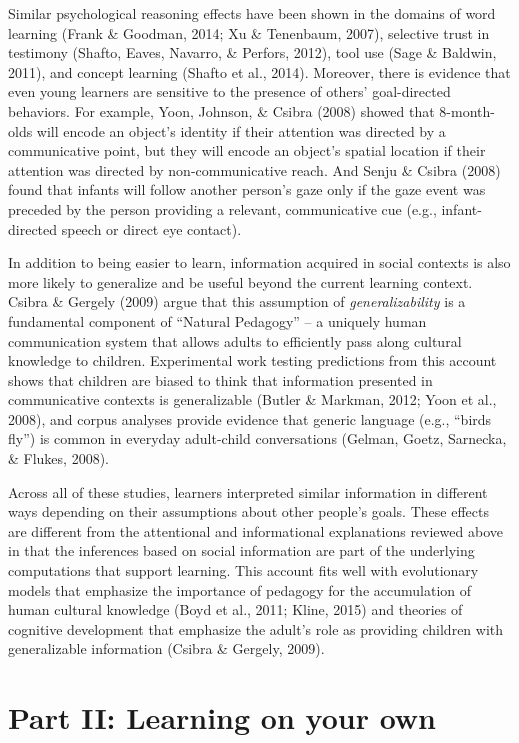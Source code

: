 \documentclass[a4paper,man,apacite,floatsintext]{apa6}
\begin{document}
Similar psychological reasoning effects have been shown in the domains
of word learning (Frank \& Goodman, 2014; Xu \& Tenenbaum, 2007),
selective trust in testimony (Shafto, Eaves, Navarro, \& Perfors, 2012),
tool use (Sage \& Baldwin, 2011), and concept learning (Shafto et al.,
2014). Moreover, there is evidence that even young learners are
sensitive to the presence of others' goal-directed behaviors. For
example, Yoon, Johnson, \& Csibra (2008) showed that 8-month-olds will
encode an object's identity if their attention was directed by a
communicative point, but they will encode an object's spatial location
if their attention was directed by non-communicative reach. And Senju \&
Csibra (2008) found that infants will follow another person's gaze only
if the gaze event was preceded by the person providing a relevant,
communicative cue (e.g., infant-directed speech or direct eye contact).

In addition to being easier to learn, information acquired in social
contexts is also more likely to generalize and be useful beyond the
current learning context. Csibra \& Gergely (2009) argue that this
assumption of \emph{generalizability} is a fundamental component of
``Natural Pedagogy'' -- a uniquely human communication system that
allows adults to efficiently pass along cultural knowledge to children.
Experimental work testing predictions from this account shows that
children are biased to think that information presented in communicative
contexts is generalizable (Butler \& Markman, 2012; Yoon et al., 2008),
and corpus analyses provide evidence that generic language (e.g.,
``birds fly'') is common in everyday adult-child conversations (Gelman,
Goetz, Sarnecka, \& Flukes, 2008).

Across all of these studies, learners interpreted similar information in
different ways depending on their assumptions about other people's
goals. These effects are different from the attentional and
informational explanations reviewed above in that the inferences based
on social information are part of the underlying computations that
support learning. This account fits well with evolutionary models that
emphasize the importance of pedagogy for the accumulation of human
cultural knowledge (Boyd et al., 2011; Kline, 2015) and theories of
cognitive development that emphasize the adult's role as providing
children with generalizable information (Csibra \& Gergely, 2009).

\section{Part II: Learning on your
own}\label{part-ii-learning-on-your-own}
\end{document}
